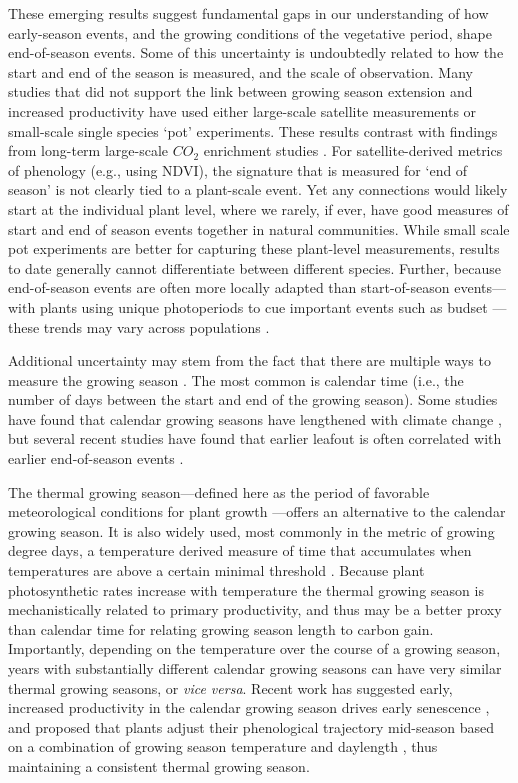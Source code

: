 \documentclass{article}[12pt]
\begin{document}
These emerging results suggest fundamental gaps in our understanding of how early-season events, and the growing conditions of the vegetative period, shape end-of-season events. Some of this uncertainty is undoubtedly related to how the start and end of the season is measured, and the scale of observation. Many studies that did not support the link between growing season extension and increased productivity have used either large-scale satellite measurements or small-scale single species `pot' experiments. These results contrast with findings from long-term large-scale $CO_2$ enrichment studies \citep{norby2021comment}. For satellite-derived metrics of phenology (e.g., using NDVI),  the signature that is measured for `end of season' is not clearly tied to a plant-scale event. Yet any connections would likely start at the individual plant level, where we rarely, if ever, have good measures of start and end of season events together in natural communities. While small scale pot experiments are better for capturing these plant-level measurements, results to date generally cannot differentiate between different species. Further, because end-of-season events are often more locally adapted than start-of-season events---with plants using unique photoperiods to cue important events such as budset \citep{bauerle2012photoperiodic,soolanayakanahally2013timing}---these trends may vary across populations \citep{aitken2016}.

Additional uncertainty may stem from the fact that there are multiple ways to measure the growing season \citep{Korner2023}. The most common is calendar time (i.e., the number of days between the start and end of the growing season). Some studies have found that calendar growing seasons have lengthened with climate change \citep{Menzel1999,Liu2010}, but several recent studies have found that earlier leafout is often correlated with earlier end-of-season events \citep{Zani2020,Liu2016,Keenan2015}. %

The thermal growing season---defined here as the period of favorable meteorological conditions for plant growth \citep{Korner2023}---offers an alternative to the calendar growing season. It is also widely used, most commonly in the metric of growing degree days, a temperature derived measure of time that accumulates when temperatures are above a certain minimal threshold \citep{CHUINE2000337,Moore:2014wl,YANG199561}. Because plant photosynthetic rates increase with temperature \citep{Farquhar:1980vm} the thermal growing season is mechanistically related to primary productivity, and thus may be a better proxy than calendar time for relating growing season length to carbon gain. Importantly, depending on the temperature over the course of a growing season, years with substantially different calendar growing seasons can have very similar thermal growing seasons, or \emph{vice versa}. Recent work has suggested early, increased productivity in the calendar growing season drives early senescence \citep{Zani2020}, and proposed that plants adjust their phenological trajectory mid-season based on a combination of growing season temperature and daylength \citep{Zohner2023}, thus maintaining a consistent thermal growing season. 
\end{document}
